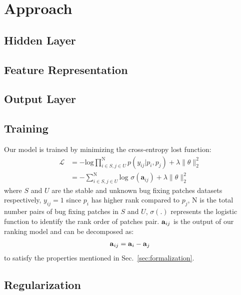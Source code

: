 \section{Approach}
\label{sec:approach}




\subsection{Hidden Layer}
\label{sec:hiddenlayer}

\subsection{Feature Representation}
\label{sec:feature}

\subsection{Output Layer}
\label{sec:output}

\subsection{Training}
\label{sec:trainingmodel}
Our model is trained by minimizing the cross-entropy lost function: 
\begin{equation}
\begin{split}
	\mathcal{L} &= -\text{log}\prod^\text{N}_{i \in S,j \in U}p(y_{ij}|p_i,p_j) + \lambda \lVert \theta \lVert^2_2 \\ &= -\sum_{i \in S,j \in U}^\text{N} \text{log } \sigma (\textbf{a}_{ij}) + \lambda \lVert \theta \lVert^2_2
\end{split}
\end{equation}
where $S$ and $U$ are the stable and unknown bug fixing patches datasets respectively, $y_{ij} = 1$ since $p_i$ has higher rank compared to $p_j$, N is the total number pairs of bug fixing patches in $S$ and $U$, $\sigma(.)$ represents the logistic function to identify the rank order of patches pair. $\text{\textbf{a}}_{ij}$ is the output of our ranking model and can be decomposed as:
\begin{equation}
\begin{split}
\text{\textbf{a}}_{ij} & = \text{\textbf{a}}_i - \text{\textbf{a}}_{j} \\
\end{split}
\end{equation}
to satisfy the properties mentioned in Sec.~\ref{sec:formalization}. 

\subsection{Regularization}
\label{sec:regularization}



